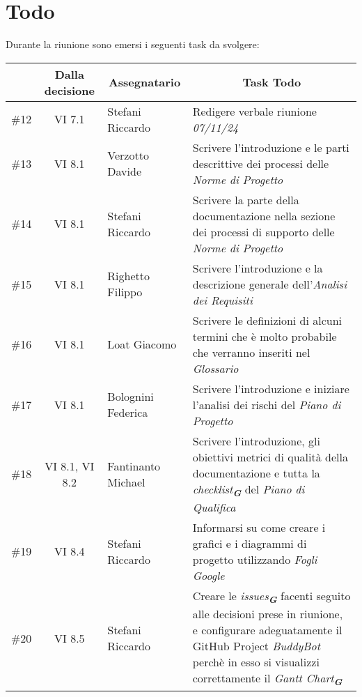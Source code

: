 

\section{Todo}

Durante la riunione sono emersi i seguenti task da svolgere:

\vspace{0.5cm}

\begin{table}[htbp]
\centering
{}
\begin{tabular}{|c|c|p{}|p{}|}
    \hline
    \rowcolor[gray]{0.75}
    \multicolumn{1}{|c|}{\textbf{Codice}} & \multicolumn{1}{|c|}{\textbf{Dalla decisione}} & \multicolumn{1}{|c|}{\textbf{Assegnatario}} 
    & \multicolumn{1}{|c|}{\textbf{Task Todo}} \\
    \hline
    \#12 & VI 7.1 & Stefani Riccardo & Redigere verbale riunione \emph{07/11/24} \\
    \hline
    \#13 & VI 8.1 & Verzotto Davide & Scrivere l'introduzione e le parti descrittive dei processi delle \emph{Norme di Progetto} \\
    \hline
    \#14 & VI 8.1 & Stefani Riccardo & Scrivere la parte della documentazione nella sezione dei processi di supporto delle \emph{Norme di Progetto} \\
    \hline
    \#15 & VI 8.1 & Righetto Filippo & Scrivere l'introduzione e la descrizione generale dell'\emph{Analisi dei Requisiti} \\
    \hline
    \#16 & VI 8.1 & Loat Giacomo & Scrivere le definizioni di alcuni termini che è molto probabile che verranno inseriti nel \emph{Glossario} \\
    \hline
    \#17 & VI 8.1 & Bolognini Federica & Scrivere l'introduzione e iniziare l'analisi dei rischi del \emph{Piano di Progetto} \\
    \hline
    \#18 & VI 8.1, VI 8.2 & Fantinanto Michael & Scrivere l'introduzione, gli obiettivi metrici di qualità della documentazione e tutta
    la \emph{checklist}\textsubscript{\textit{\textbf{G}}} del \emph{Piano di Qualifica} \\
    \hline
    \#19 & VI 8.4 & Stefani Riccardo & Informarsi su come creare i grafici e i diagrammi di progetto utilizzando \emph{Fogli Google} \\
    \hline
    \#20 & VI 8.5 & Stefani Riccardo & Creare le \emph{issues}\textsubscript{\textit{\textbf{G}}} facenti seguito alle decisioni prese in riunione, e 
    configurare adeguatamente il GitHub Project \emph{BuddyBot} perchè in esso si visualizzi correttamente il 
    \emph{Gantt Chart}\textsubscript{\textit{\textbf{G}}} \\
    \hline
\end{tabular}
\end{table}
